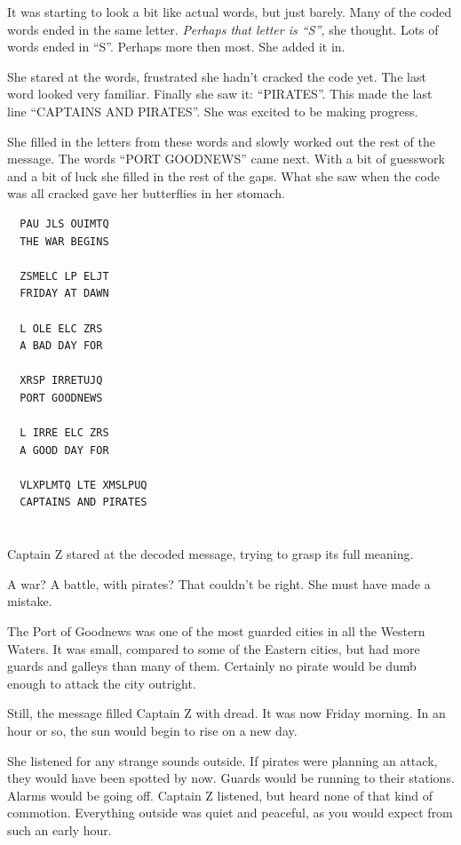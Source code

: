 \documentclass[12pt]{extbook}
\begin{document}
  It was starting to look a bit like actual words, but just barely. Many
  of the coded words ended in the same letter. \emph{Perhaps that letter
  is \enquote{S},} she thought. Lots of words ended in \enquote{S}.
  Perhaps more then most. She added it in.
  
  She stared at the words, frustrated she hadn't cracked the code yet. The
  last word looked very familiar. Finally she saw it: \enquote{PIRATES}.
  This made the last line \enquote{CAPTAINS AND PIRATES}. She was excited
  to be making progress.
  
  She filled in the letters from these words and slowly worked out the
  rest of the message. The words \enquote{PORT GOODNEWS} came next. With a
  bit of guesswork and a bit of luck she filled in the rest of the gaps.
  What she saw when the code was all cracked gave her butterflies in her
  stomach.
  
  \begin{lstlisting}
  PAU JLS OUIMTQ
  THE WAR BEGINS
  
  ZSMELC LP ELJT
  FRIDAY AT DAWN
  
  L OLE ELC ZRS
  A BAD DAY FOR
  
  XRSP IRRETUJQ
  PORT GOODNEWS
  
  L IRRE ELC ZRS
  A GOOD DAY FOR
  
  VLXPLMTQ LTE XMSLPUQ
  CAPTAINS AND PIRATES
  \end{lstlisting}
  
  \section{}\label{section-35}
  
  Captain Z stared at the decoded message, trying to grasp its full
  meaning.
  
  A war? A battle, with pirates? That couldn't be right. She must have
  made a mistake.
  
  The Port of Goodnews was one of the most guarded cities in all the
  Western Waters. It was small, compared to some of the Eastern cities,
  but had more guards and galleys than many of them. Certainly no pirate
  would be dumb enough to attack the city outright.
  
  Still, the message filled Captain Z with dread. It was now Friday
  morning. In an hour or so, the sun would begin to rise on a new day.
  
  She listened for any strange sounds outside. If pirates were planning an
  attack, they would have been spotted by now. Guards would be running to
  their stations. Alarms would be going off. Captain Z listened, but heard
  none of that kind of commotion. Everything outside was quiet and
  peaceful, as you would expect from such an early hour.
  
\end{document}
